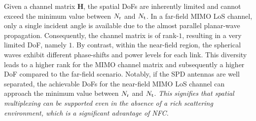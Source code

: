 \documentclass[journal]{IEEEtran}
\theoremstyle{definition}
\begin{document}
Given a channel matrix $\mathbf{H}$, the spatial DoFs are inherently limited and cannot exceed the minimum value between $N_{\rm{r}}$ and $N_{\rm{t}}$. In a far-field MIMO LoS channel, only a single incident angle is available due to the almost parallel planar-wave propagation. Consequently, the channel matrix is of rank-$1$, resulting in a very limited DoF, namely $1$. By contrast, within the near-field region, the spherical waves exhibit different phase-shifts and power levels for each link. This diversity leads to a higher rank for the MIMO channel matrix and subsequently a higher DoF compared to the far-field scenario. Notably, if the SPD antennas are well separated, the achievable DoFs for the near-field MIMO LoS channel can approach the minimum value between $N_{\rm{r}}$ and $N_{\rm{t}}$. \emph{This signifies that spatial multiplexing can be supported even in the absence of a rich scattering environment, which is a significant advantage of NFC.}
\end{document}
